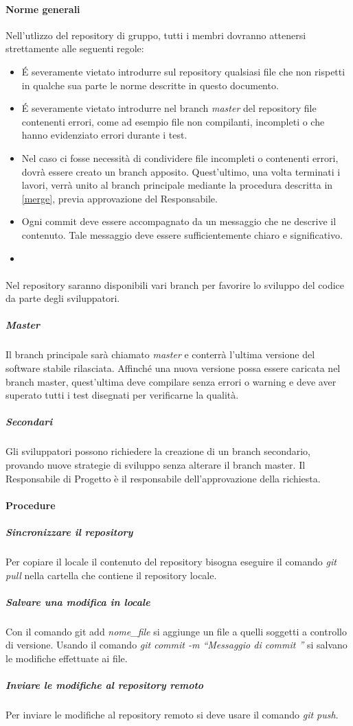 \paragraph{Norme generali}
Nell'utlizzo del repository di gruppo, tutti i membri dovranno attenersi strettamente alle seguenti regole:
\begin{itemize}
\item \'E severamente vietato introdurre sul repository qualsiasi file che non rispetti in qualche sua parte le norme descritte in questo documento.
\item \'E severamente vietato introdurre nel branch \textit{master} del repository file contenenti errori, come ad esempio file non compilanti, incompleti o che hanno evidenziato errori durante i test.
\item Nel caso ci fosse necessità di condividere file incompleti o contenenti errori, dovrà essere creato un branch apposito. Quest'ultimo, una volta terminati i lavori, verrà unito al branch principale mediante la procedura descritta in \ref{merge}, previa approvazione del Responsabile.
\item Ogni commit deve essere accompagnato da un messaggio che ne descrive il contenuto. Tale messaggio deve essere sufficientemente chiaro e significativo.
\item 
\end{itemize}


\paragraph{}
\label{4.4}
Nel repository saranno disponibili vari branch per favorire lo sviluppo del codice da parte degli sviluppatori.

\subparagraph{Master}
\label{4.4.1}
Il branch principale sarà chiamato \textit{master} e conterrà l'ultima versione del software stabile rilasciata. Affinché una nuova versione possa essere caricata nel branch master, quest'ultima deve compilare senza errori o warning e deve aver superato tutti i test disegnati per verificarne la qualità.

\subparagraph{Secondari}
\label{4.4.2}
Gli sviluppatori possono richiedere la creazione di un branch secondario, provando nuove strategie di sviluppo senza alterare il branch master. Il Responsabile di Progetto è il responsabile dell'approvazione della richiesta.

\paragraph{Procedure}
\subparagraph{Sincronizzare il repository}
Per copiare il locale il contenuto del repository bisogna eseguire il comando \textit{git pull} nella cartella che contiene il repository locale.
\subparagraph{Salvare una modifica in locale}
Con il comando git add \textit{nome\_file} si aggiunge un file a quelli soggetti a controllo di versione. Usando il comando \textit{git commit -m “Messaggio di commit ”} si salvano le modifiche effettuate ai file.
\subparagraph{Inviare le modifiche al repository remoto}
Per inviare le modifiche al repository remoto si deve usare il comando \textit{git push}.

